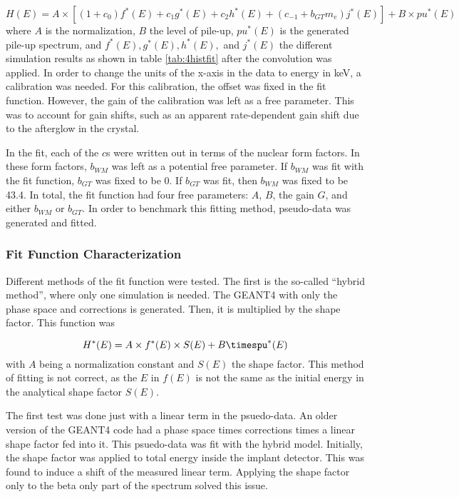 \documentclass[../MaxHughesThesis.tex]{subfiles}
\begin{document}
\begin{equation}
	H(E) = A \times [( 1 + c_{0}) f^{*}(E) + c_{1}g^{*}(E) + c_{2} h^{*}(E) + (c_{-1} + b_{GT} m_{e}) j^{*}(E)] + B \times pu^{*}(E)
	\label{eq:betafit}
\end{equation}
where $A$ is the normalization, $B$ the level of pile-up, $pu^{*}(E)$ is the generated pile-up spectrum, and $f^{*}(E),g^{*}(E),h^{*}(E),$ and $j^{*}(E)$ the different simulation results as shown in table \ref{tab:4histfit} after the convolution was applied.
In order to change the units of the x-axis in the data to energy in keV, a calibration was needed.
For this calibration, the offset was fixed in the fit function.
However, the gain of the calibration was left as a free parameter.
This was to account for gain shifts, such as an apparent rate-dependent gain shift due to the afterglow in the crystal.

In the fit, each of the $c$s were written out in terms of the nuclear form factors.
In these form factors, $b_{WM}$ was left as a potential free parameter. 
If $b_{WM}$ was fit with the fit function, $b_{GT}$ was fixed to be 0. 
If $b_{GT}$ was fit, then $b_{WM}$ was fixed to be 43.4. 
In total, the fit function had four free parameters:
$A$, $B$, the gain $G$, and either $b_{WM}$ or $b_{GT}$. 
In order to benchmark this fitting method, pseudo-data was generated and fitted.

\subsubsection{Fit Function Characterization}
Different methods of the fit function were tested. 
The first is the so-called ``hybrid method'', where only one simulation is needed.
The GEANT4 with only the phase space and corrections is generated. 
Then, it is multiplied by the shape factor.
This function was 

\begin{equation}
	H^{*}(E) = A \times f^{*}(E) \times S(E) + B\timespu^{*}(E)
	\label{eq:hybridmodel}
\end{equation}
with $A$ being a normalization constant and $S(E)$ the shape factor. 
This method of fitting is not correct, as the $E$ in $f(E)$ is not the same as the initial energy in the analytical shape factor $S(E)$. 

The first test was done just with a linear term in the psuedo-data.
An older version of the GEANT4 code had a phase space times corrections times a linear shape factor fed into it.
This psuedo-data was fit with the hybrid model.
Initially, the shape factor was applied to total energy inside the implant detector.
This was found to induce a shift of the measured linear term.
Applying the shape factor only to the beta only part of the spectrum solved this issue. 
\end{document}
